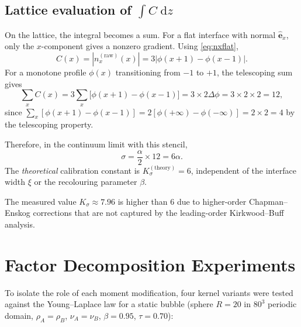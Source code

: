 \documentclass[11pt,a4paper]{article}
\newcommand{\vect}[1]{\bm{#1}}
\newcommand{\hatx}{\hat{\vect{e}}_x}
\begin{document}
\subsection{Lattice evaluation of $\int C\;\mathrm{d}z$}
\label{sec:intCdz}

On the lattice, the integral becomes a sum.  For a flat interface with
normal $\hatx$, only the $x$-component gives a nonzero gradient.  Using
\eqref{eq:nxflat},
\begin{equation}
  C(x) = |n_x^{(\text{raw})}(x)| = 3\bigl|\phi(x+1)-\phi(x-1)\bigr|.
\end{equation}
For a monotone profile $\phi(x)$ transitioning from $-1$ to $+1$,
the telescoping sum gives
\begin{equation}
  \sum_x C(x) = 3\sum_x \bigl[\phi(x+1)-\phi(x-1)\bigr]
  = 3\times 2\Delta\phi = 3\times 2\times 2 = 12 ,
  \label{eq:telescope}
\end{equation}
since $\sum_x[\phi(x+1)-\phi(x-1)] = 2[\phi(+\infty)-\phi(-\infty)] =
2\times 2 = 4$ by the telescoping property.

Therefore, in the continuum limit with this stencil,
\begin{equation}
  \sigma = \frac{\alpha}{2}\times 12 = 6\alpha.
  \label{eq:sigma6}
\end{equation}
The \emph{theoretical} calibration constant is $K_\sigma^{(\text{theory})} = 6$,
independent of the interface width $\xi$ or the recolouring parameter
$\beta$.

The measured value $K_\sigma \approx 7.96$ is higher than 6 due to
higher-order Chapman--Enskog corrections that are not captured by the
leading-order Kirkwood--Buff analysis.

\section{Factor Decomposition Experiments}
\label{sec:factor}

To isolate the role of each moment modification, four kernel variants were
tested against the Young--Laplace law for a static bubble (sphere $R=20$
in $80^3$ periodic domain, $\rho_A=\rho_B$, $\nu_A=\nu_B$, $\beta=0.95$,
$\tau=0.70$):
\end{document}

